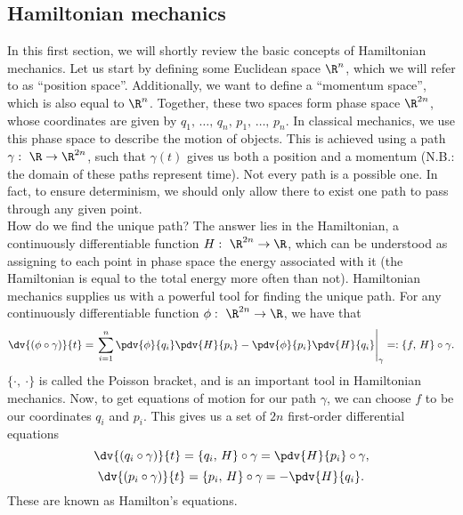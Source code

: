 \documentclass{article}
\begin{document}
\begin{multicols}{2}
	\section{Hamiltonian mechanics}
	In this first section, we will shortly review the basic concepts of Hamiltonian mechanics. Let us start by defining some Euclidean space \(\R^n\), which we will refer to as ``position space''. Additionally, we want to define a ``momentum space'', which is also equal to \(\R^n\).
	Together, these two spaces form phase space \(\R^{2n}\), whose coordinates are given by \(q_1,\,\dots,\,q_n,\,p_1,\,\dots,\,p_n\). In classical mechanics, we use this phase space to describe the motion of objects. This is achieved using a path \(\gamma:\ \R\to\R^{2n}\), such that \(\gamma(t)\) gives us both a position and a momentum (N.B.: the domain of these paths represent time).
	Not every path is a possible one. In fact, to ensure determinism, we should only allow there to exist one path to pass through any given point.\\
	How do we find the unique path? The answer lies in the Hamiltonian, a continuously differentiable function \(H:\ \R^{2n}\to\R\), which can be understood as assigning to each point in phase space the energy associated with it (the Hamiltonian is equal to the total energy more often than not).
	Hamiltonian mechanics supplies us with a powerful tool for finding the unique path. For any continuously differentiable function \(\phi:\ \R^{2n}\to\R\), we have that
	\begin{equation}
		\dv{(\phi\circ\gamma)}{t} = \left.\sum_{i=1}^n \pdv{\phi}{q_i}\pdv{H}{p_i} - \pdv{\phi}{p_i}\pdv{H}{q_i}\right|_{\gamma} =: \{f,\,H\}\circ\gamma.
	\end{equation}
	\(\{\cdot,\ \cdot\}\) is called the Poisson bracket, and is an important tool in Hamiltonian mechanics.
	Now, to get equations of motion for our path \(\gamma\), we can choose \(f\) to be our coordinates \(q_i\) and \(p_i\). This gives us a set of \(2n\) first-order differential equations
	\begin{equation}
		\dv{(q_i\circ\gamma)}{t} = \{q_i,\,H\}\circ\gamma = \pdv{H}{p_i}\circ\gamma,
	\end{equation}
	\begin{equation}
		\dv{(p_i\circ\gamma)}{t} = \{p_i,\,H\}\circ\gamma = -\pdv{H}{q_i}.
	\end{equation}
	These are known as Hamilton's equations.\\

\end{multicols}
\end{document}
